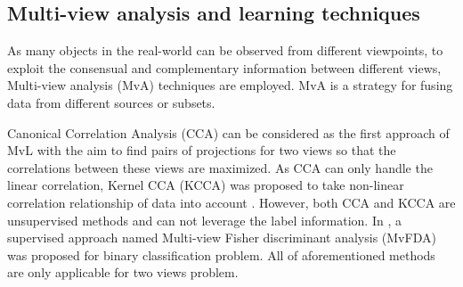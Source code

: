 
    \subsection{Multi-view analysis and learning techniques}
        As many objects in the real-world can be observed from different viewpoints, to exploit the consensual and complementary information between different views, Multi-view analysis (MvA) techniques are employed.
        MvA is a strategy for fusing data from different sources or subsets.

        Canonical Correlation Analysis (CCA) \cite{Hotelling} can be considered as the first approach of MvL with the aim to find pairs of projections for two views so that the correlations between these views are maximized.
        As CCA can only handle the linear correlation, Kernel CCA (KCCA) was proposed to take non-linear correlation relationship of data into account \cite{Akaho2006}.
        However, both CCA and KCCA are unsupervised methods and can not leverage the label information.
        In \cite{diethe2008multiview}, a supervised approach named Multi-view Fisher discriminant analysis (MvFDA) was proposed for binary classification problem.
        All of aforementioned methods are only applicable for two views problem.

